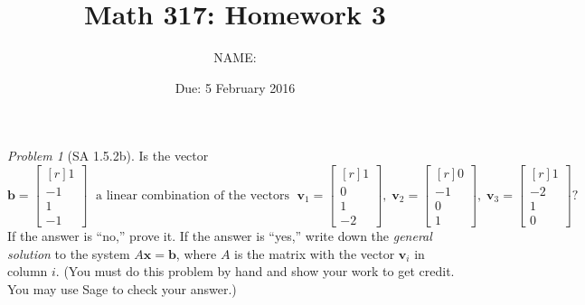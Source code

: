 \documentclass[fleqn,11pt]{paper}
\author         {NAME:                     }
\title{Math 317: Homework 3}
\date{Due: 5 February 2016}
\theoremstyle{remark}
\newtheorem{problem}{Problem}
\renewcommand{\vec}[1]{\mathbf{#1}}
\newcommand\vb{\vec{b}}
\newcommand\vv{\vec{v}}
\newcommand\vx{\vec{x}}
\begin{document}
\maketitle




\begin{problem}[SA 1.5.2b]
  Is the vector
  \[
  \vb = \begin{bmatrix*}[r] 1 \\ -1 \\ 1 \\ -1\end{bmatrix*} \;
  \text{ a linear combination of the vectors } \;
  \vv_1 = \begin{bmatrix*}[r] 1 \\ 0 \\ 1 \\ -2\end{bmatrix*},
  \;
  \vv_2 = \begin{bmatrix*}[r] 0 \\ -1 \\ 0 \\ 1 \end{bmatrix*},
  \;
  \vv_3 = \begin{bmatrix*}[r] 1\\ -2 \\ 1 \\ 0 \end{bmatrix*}?
  \]
  If the answer is ``no,'' prove it.  If the answer is ``yes,'' write down the \emph{general 
  solution} to the system $A\vx = \vb$, where $A$ is the matrix with the vector $\vv_i$ in column $i$.
  (You must do this problem by hand and show your work to get credit.  You may use Sage to check your answer.)
\end{problem}
\end{document}
